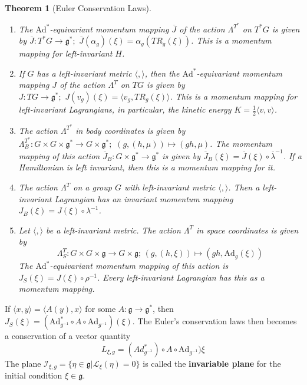 \documentclass{article}
\newtheorem{thm}{Theorem}
\begin{document}
\begin{thm}[Euler Conservation Laws]\label{thm:3}

    \begin{enumerate}
        \item The $\mathrm{Ad}^*$-equivariant momentum mapping $\overline{J}$ of the action $\Lambda^{T^*}$ on $T^*G$ is given by $\overline{J}: T^*G \to \mathfrak{g}^*; \hspace{4pt} \overline{J}(\alpha_g)(\xi) = \alpha_g(TR_g(\xi))$. This is a momentum mapping for left-invariant $H$.
        \item If $G$ has a left-invariant metric $\langle, \rangle$, then the $\mathrm{Ad}^*$-equivariant momentum mapping $J$ of the action $\Lambda^T$ on $TG$ is given by $J: TG \to \mathfrak{g}^*; \hspace{4pt} J(v_g)(\xi) = \langle v_g, TR_g(\xi) \rangle$. This is a momentum mapping for left-invariant Lagrangians, in particular, the kinetic energy $K = \frac{1}{2}\langle v, v \rangle$.
        \item The action $\Lambda^{T^*}$ in body coordinates is given by $\Lambda^{T^*}_B: G \times G \times \mathfrak{g}^* \to G \times \mathfrak{g}^*; \hspace{4pt} (g,(h,\mu)) \mapsto (gh,\mu)$. The momentum mapping of this action $\overline{J}_B: G \times \mathfrak{g}^* \to \mathfrak{g}^*$ is given by $\overline{J}_B(\xi) = \overline{J}(\xi) \circ \overline{\lambda}^{-1}$. If a Hamiltonian is left invariant, then this is a momentum mapping for it.
        \item The action $\Lambda^T$ on a group $G$ with left-invariant metric $\langle , \rangle$. Then a left-invariant Lagrangian has an invariant momentum mapping $J_B(\xi) = J(\xi) \circ \lambda^{-1}$.
        \item Let $\langle , \rangle$ be a left-invariant metric. The action $\Lambda^T$ in space coordinates is given by 
        \begin{equation}\Lambda^T_S: G \times G \times \mathfrak{g} \to G \times \mathfrak{g}; \hspace{2pt} (g,(h,\xi)) \mapsto (gh, \mathrm{Ad}_g(\xi))\end{equation}
        The $\mathrm{Ad}^*$-equivariant momentum mapping of this action is $J_S(\xi) = J(\xi) \circ \rho^{-1}$. Every left-invariant Lagrangian has this as a momentum mapping.
    \end{enumerate}
\end{thm}

If $\langle x, y \rangle = \langle A(y), x \rangle$ for some $A:\mathfrak{g} \to \mathfrak{g}^*$, then $J_S(\xi) = (\mathrm{Ad}^*_{g^{-1}} \circ A \circ \mathrm{Ad}_{g^{-1}})(\xi)$. The Euler's conservation laws then becomes a conservation of a vector quantity 
\begin{equation}L_{\xi,g} = (Ad^*_{g^{-1}}) \circ A \circ \mathrm{Ad}_{g^{-1}}) \xi\end{equation}
The plane $\mathcal{I}_{\xi, g} = \{ \eta \in \mathfrak{g} \vert \mathcal{L}_{\xi} (\eta) = 0 \}$ is called the \textbf{invariable plane} for the initial condition $\xi \in \mathfrak{g}$.
\end{document}

